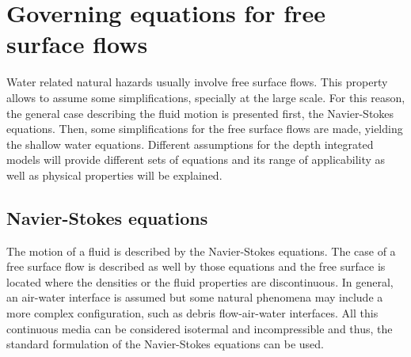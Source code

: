 
\chapter{Governing equations for free surface flows}
\label{equations}








Water related natural hazards usually involve free surface flows.
This property allows to assume some simplifications, specially at the large scale.
For this reason, the general case describing the fluid motion is presented first, the Navier-Stokes equations.
Then, some simplifications for the free surface flows are made, yielding the shallow water equations. Different assumptions for the depth integrated models will provide different sets of equations and its range of applicability as well as physical properties will be explained.




\section{Navier-Stokes equations}
\label{equations_ns}


The motion of a fluid is described by the Navier-Stokes equations. The case of a free surface flow is described as well by those equations and the free surface is located where the densities or the fluid properties are discontinuous. In general, an air-water interface is assumed but some natural phenomena may include a more complex configuration, such as debris flow-air-water interfaces. All this continuous media can be considered isotermal and incompressible and thus, the standard formulation of the Navier-Stokes equations can be used.

